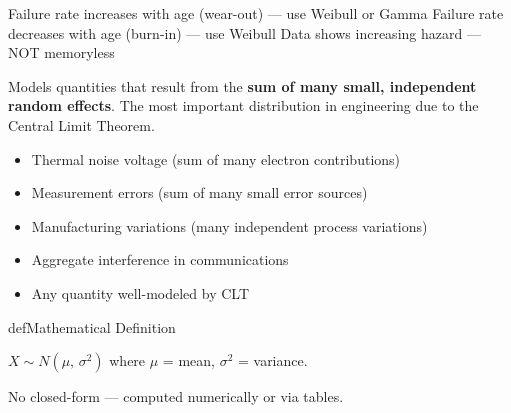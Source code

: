
\PSno{} Failure rate increases with age (wear-out) — use Weibull or Gamma\PSbr{}\PSno{} Failure rate decreases with age (burn-in) — use Weibull\PSbr{}\PSno{} Data shows increasing hazard — NOT memoryless



Models quantities that result from the \textbf{sum of many small, independent random effects}. The most important distribution in engineering due to the Central Limit Theorem.


\begin{itemize}
\tightlist
\item
  Thermal noise voltage (sum of many electron contributions)
\item
  Measurement errors (sum of many small error sources)
\item
  Manufacturing variations (many independent process variations)
\item
  Aggregate interference in communications
\item
  Any quantity well-modeled by CLT
\end{itemize}

\begin{PSbox}[unbreakable]{def}{Mathematical Definition}

$X \sim N(\mu,\, \sigma^{2})$ where $\mu$ = mean, $\sigma^{2}$ = variance.

\end{PSbox}





No closed-form — computed numerically or via tables.





